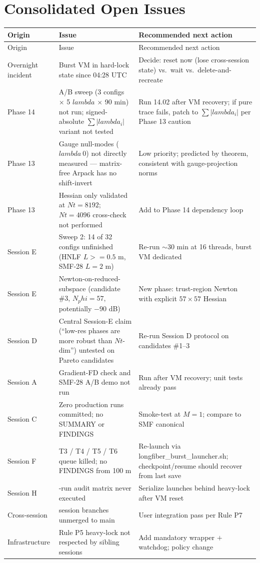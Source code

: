 \documentclass[11pt,letterpaper]{article}
\def\varphi{phi}%
\def\mathrm#1{#1}%
\def\lambda{lambda}%
\def\geq{>=}%
\def\approx{~}%
\def\texttt#1{#1}%
\begin{document}
\newpage
\section{Consolidated Open Issues}

\footnotesize
\begin{longtable}{>{\raggedright\arraybackslash}p{2.3cm}>{\raggedright\arraybackslash}p{8cm}>{\raggedright\arraybackslash}p{5.5cm}}
\toprule
Origin & Issue & Recommended next action \\
\midrule
\endfirsthead
\toprule
Origin & Issue & Recommended next action \\
\midrule
\endhead
Overnight incident & Burst VM in hard-lock state since 04:28 UTC & Decide: reset now (lose cross-session state) vs.\ wait vs.\ delete-and-recreate \\
Phase 14 & 14.02 A/B sweep (3 configs $\times$ 5 $\lambda$ $\times$ 90 min) not run; signed-absolute $\sum |\lambda_i|$ variant not tested & Run 14.02 after VM recovery; if pure trace fails, patch to $\sum |\lambda_i|$ per Phase 13 caution \\
Phase 13 & Gauge null-modes ($\lambda \approx 0$) not directly measured --- matrix-free Arpack has no shift-invert & Low priority; predicted by theorem, consistent with gauge-projection norms \\
Phase 13 & Hessian only validated at $\mathrm{Nt} = 8192$; $\mathrm{Nt} = 4096$ cross-check not performed & Add to Phase 14 dependency loop \\
Session E & Sweep 2: 14 of 32 configs unfinished (HNLF $L \geq 0.5$ m, SMF-28 $L = 2$ m) & Re-run $\sim 30$ min at 16 threads, burst VM dedicated \\
Session E & Newton-on-reduced-subspace (candidate \#3, $\mathrm{N}_\varphi = 57$, potentially $-90$ dB) & New phase: trust-region Newton with explicit $57 \times 57$ Hessian \\
Session D & Central Session-E claim (``low-res phases are more robust than $\mathrm{Nt}$-dim'') untested on Pareto candidates & Re-run Session D protocol on candidates \#1--3 \\
Session A & Gradient-FD check and SMF-28 A/B demo not run & Run after VM recovery; unit tests already pass \\
Session C & Zero production runs committed; no SUMMARY or FINDINGS & Smoke-test at $M = 1$; compare to SMF canonical \\
Session F & T3 / T4 / T5 / T6 queue killed; no FINDINGS from 100 m & Re-launch via \texttt{longfiber\_burst\_launcher.sh}; checkpoint/resume should recover from last save \\
Session H & 12-run audit matrix never executed & Serialize launches behind heavy-lock after VM reset \\
Cross-session & 7 session branches unmerged to \texttt{main} & User integration pass per Rule P7 \\
Infrastructure & Rule P5 heavy-lock not respected by sibling sessions & Add mandatory wrapper $+$ watchdog; policy change \\
\bottomrule
\end{longtable}
\normalsize
\end{document}
